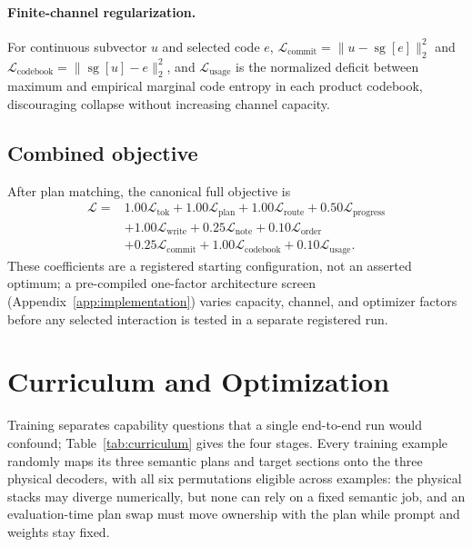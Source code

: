 \documentclass[10pt]{article}
\newcommand{\sg}{\operatorname{sg}}
\begin{document}
\paragraph{Finite-channel regularization.}
For continuous subvector \(u\) and selected code \(e\),
\(\mathcal L_{\mathrm{commit}}=\|u-\sg[e]\|_2^2\) and
\(\mathcal L_{\mathrm{codebook}}=\|\sg[u]-e\|_2^2\),
and \(\mathcal L_{\mathrm{usage}}\) is the normalized deficit between maximum
and empirical marginal code entropy in each product codebook, discouraging
collapse without increasing channel capacity.

\subsection{Combined objective}

After plan matching, the canonical full objective is
\begin{align}
\mathcal L
={}&1.00\mathcal L_{\mathrm{tok}}
+1.00\mathcal L_{\mathrm{plan}}
+1.00\mathcal L_{\mathrm{route}}
+0.50\mathcal L_{\mathrm{progress}}
\nonumber\\
&+1.00\mathcal L_{\mathrm{write}}
+0.25\mathcal L_{\mathrm{note}}
+0.10\mathcal L_{\mathrm{order}}
\nonumber\\
&+0.25\mathcal L_{\mathrm{commit}}
+1.00\mathcal L_{\mathrm{codebook}}
+0.10\mathcal L_{\mathrm{usage}}.
\label{eq:objective}
\end{align}
These coefficients are a registered starting configuration, not an asserted
optimum; a pre-compiled one-factor architecture screen
(Appendix~\ref{app:implementation}) varies capacity, channel, and optimizer
factors before any selected interaction is tested in a separate registered
run.

\section{Curriculum and Optimization}
\label{sec:curriculum}

Training separates capability questions that a single end-to-end run would
confound; Table~\ref{tab:curriculum} gives the four stages. Every training
example randomly maps its three semantic plans and target sections onto the
three physical decoders, with all six permutations eligible across examples:
the physical stacks may diverge numerically, but none can rely on a fixed
semantic job, and an evaluation-time plan swap must move ownership with the
plan while prompt and weights stay fixed.
\end{document}
